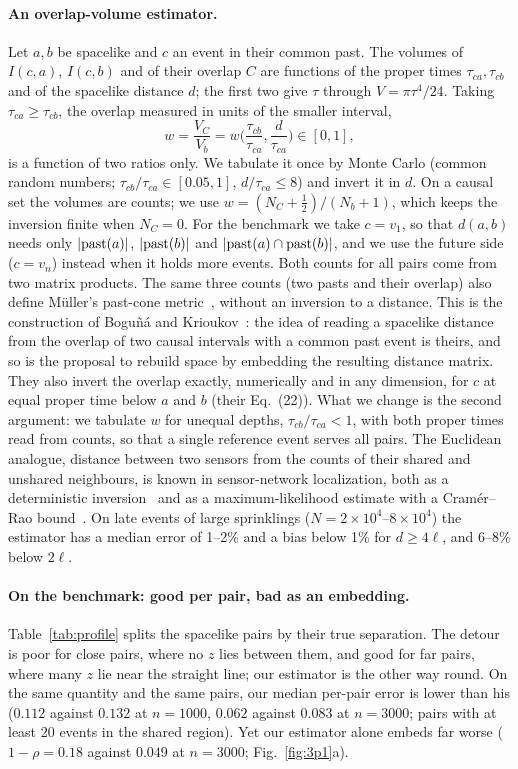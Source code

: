 \documentclass[11pt,a4paper]{article}
\begin{document}
\paragraph{An overlap-volume estimator.} Let $a,b$ be spacelike and $c$ an event in their common past. The volumes of $I(c,a)$, $I(c,b)$ and of their overlap $C$ are functions of the proper times $\tau_{ca},\tau_{cb}$ and of the spacelike distance $d$; the first two give $\tau$ through $V=\pi\tau^4/24$. Taking $\tau_{ca}\ge\tau_{cb}$, the overlap measured in units of the smaller interval,
\begin{equation}
w=\frac{V_C}{V_b}=w\Big(\frac{\tau_{cb}}{\tau_{ca}},\frac{d}{\tau_{ca}}\Big)\in[0,1],
\end{equation}
is a function of two ratios only. We tabulate it once by Monte Carlo (common random numbers; $\tau_{cb}/\tau_{ca}\in[0.05,1]$, $d/\tau_{ca}\le8$) and invert it in $d$. On a causal set the volumes are counts; we use $w=(N_C+\tfrac12)/(N_b+1)$, which keeps the inversion finite when $N_C=0$. For the benchmark we take $c=v_1$, so that $d(a,b)$ needs only $|{\rm past}(a)|$, $|{\rm past}(b)|$ and $|{\rm past}(a)\cap{\rm past}(b)|$, and we use the future side ($c=v_n$) instead when it holds more events. Both counts for all pairs come from two matrix products. The same three counts (two pasts and their overlap) also define M\"uller's past-cone metric~\cite{Muller25}, without an inversion to a distance. This is the construction of Bogu\~n\'a and Krioukov~\cite{BK24}: the idea of reading a spacelike distance from the overlap of two causal intervals with a common past event is theirs, and so is the proposal to rebuild space by embedding the resulting distance matrix. They also invert the overlap exactly, numerically and in any dimension, for $c$ at equal proper time below $a$ and $b$ (their Eq.~(22)). What we change is the second argument: we tabulate $w$ for unequal depths, $\tau_{cb}/\tau_{ca}<1$, with both proper times read from counts, so that a single reference event serves all pairs. The Euclidean analogue, distance between two sensors from the counts of their shared and unshared neighbours, is known in sensor-network localization, both as a deterministic inversion~\cite{Buschmann06} and as a maximum-likelihood estimate with a Cram\'er--Rao bound~\cite{Huang14}. On late events of large sprinklings ($N=2\times10^4$--$8\times10^4$) the estimator has a median error of 1--2\% and a bias below 1\% for $d\ge4\ell$, and 6--8\% below $2\ell$.

\paragraph{On the benchmark: good per pair, bad as an embedding.} Table~\ref{tab:profile} splits the spacelike pairs by their true separation. The detour is poor for close pairs, where no $z$ lies between them, and good for far pairs, where many $z$ lie near the straight line; our estimator is the other way round. On the same quantity and the same pairs, our median per-pair error is lower than his ($0.112$ against $0.132$ at $n=1000$, $0.062$ against $0.083$ at $n=3000$; pairs with at least 20 events in the shared region). Yet our estimator alone embeds far worse ($1-\rho=0.18$ against $0.049$ at $n=3000$; Fig.~\ref{fig:3p1}a).
\end{document}

